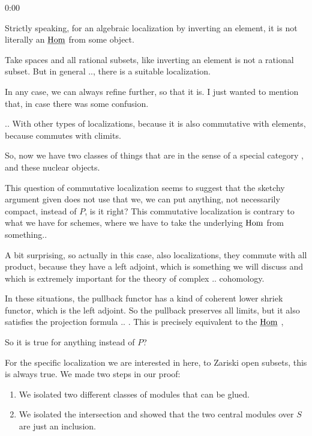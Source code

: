 \begin{unfinished}{0:00}
{\begin{theorem}
\begin{remark}
%
\clausen Strictly speaking, for an algebraic localization by inverting an element, it is not literally an $\operatorname{\underline{Hom}}$ from some object.

\scholze Take  spaces and all rational subsets, like inverting an element is not a rational subset. But in general .., there is a suitable localization. 

\clausen In any case, we can always refine further, so that it is. I just wanted to mention that, in case there was some confusion. 

\scholze ..  With other types of localizations, because it is also commutative with elements, because commutes with climits. 

So, now we have  two classes of things that are in the sense of a special category , and these nuclear objects. 

\gabber This question of commutative localization seems to suggest that the sketchy argument given does not use that we, we can put anything, not necessarily compact, instead of $P$, is it right? This commutative localization is contrary to what we have for schemes, where we have to take the underlying $\operatorname{Hom}$ from something..

\scholze A bit surprising, so actually in this case, also localizations, they commute with all product, because they have a left adjoint, which is something we will discuss and which is extremely important for the theory of complex ..  cohomology. 

In these situations, the pullback functor has a kind of coherent lower shriek functor, which is the left adjoint. So the pullback preserves all limits, but it also satisfies the projection formula .. . This is precisely equivalent to the $\operatorname{\underline{Hom}}$ , 

\gabber So it is true for anything instead of $P$?

\scholze 

%
For the specific localization we are interested in here, to Zariski open subsets, this is always true. We made two steps in our proof: 
\begin{enumerate}
\item We isolated two different classes of modules that can be glued.
\item We isolated the intersection and showed that the two central modules over $S$ are just an inclusion.
\end{enumerate}


\end{remark}
\end{theorem}}
\end{unfinished}
